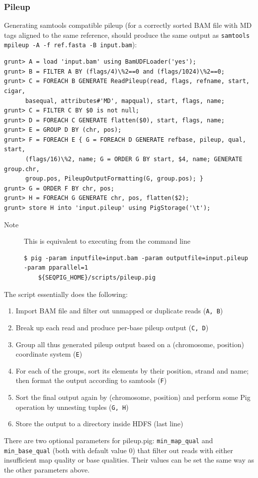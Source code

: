 \subsubsection{Pileup}
Generating samtools compatible pileup (for a correctly sorted BAM file
with MD tags aligned to the same reference, should produce the same output as
{\tt samtools mpileup -A -f ref.fasta -B input.bam}):
\begin{lstlisting}
grunt> A = load 'input.bam' using BamUDFLoader('yes');
grunt> B = FILTER A BY (flags/4)\%2==0 and (flags/1024)\%2==0;
grunt> C = FOREACH B GENERATE ReadPileup(read, flags, refname, start, cigar,
      basequal, attributes#'MD', mapqual), start, flags, name;
grunt> C = FILTER C BY $0 is not null;
grunt> D = FOREACH C GENERATE flatten($0), start, flags, name;
grunt> E = GROUP D BY (chr, pos);
grunt> F = FOREACH E { G = FOREACH D GENERATE refbase, pileup, qual, start,
      (flags/16)\%2, name; G = ORDER G BY start, $4, name; GENERATE group.chr,
      group.pos, PileupOutputFormatting(G, group.pos); }
grunt> G = ORDER F BY chr, pos;
grunt> H = FOREACH G GENERATE chr, pos, flatten($2);
grunt> store H into 'input.pileup' using PigStorage('\t');
\end{lstlisting}
\begin{description}
	\item[Note] This is equivalent to executing from the command line
\begin{lstlisting}
$ pig -param inputfile=input.bam -param outputfile=input.pileup -param pparallel=1
    ${SEQPIG_HOME}/scripts/pileup.pig
\end{lstlisting}
\end{description}
The script essentially does the following:
\begin{enumerate}
\item Import BAM file and filter out unmapped or duplicate reads ({\tt A, B})
\item Break up each read and produce per-base pileup output ({\tt C, D})
\item Group all thus generated pileup output based on a (chromosome, position)
coordinate system ({\tt E})
\item For each of the groups, sort its elements by their position, strand and name;
then format the output according to samtools ({\tt F})
\item Sort the final output again by (chromosome, position) and perform
some Pig operation by unnesting tuples ({\tt G, H})
\item Store the output to a directory inside HDFS (last line)
\end{enumerate}
There are two optional parameters for pileup.pig: {\tt min\_map\_qual} and
{\tt min\_base\_qual} (both with default value 0) that filter out reads with
either insufficient map quality or base qualities. Their values can
be set the same way as the other parameters above.

